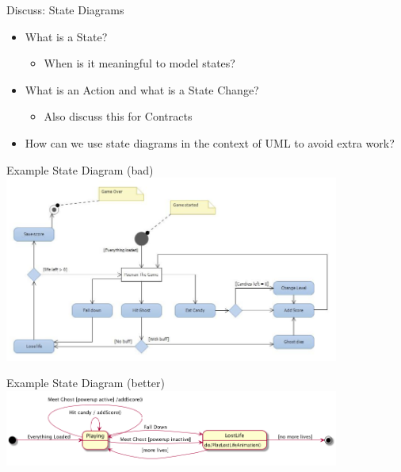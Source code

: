 \documentclass[10pt,t,a4paper]{beamer}
\begin{document}
\begin{frame}[label=sec-1-7]{Discuss: State Diagrams}
\begin{itemize}
\item What is a State?
\begin{itemize}
\item When is it meaningful to model states?
\end{itemize}
\item What is an Action and what is a State Change?
\begin{itemize}
\item Also discuss this for Contracts
\end{itemize}
\item How can we use state diagrams in the context of UML to avoid extra work?
\end{itemize}
\end{frame}
\begin{frame}[label=sec-1-8]{Example State Diagram (bad)}
\includegraphics[width=11cm]{./IExampleBadStateChart.png}
\end{frame}
\begin{frame}[label=sec-1-9]{Example State Diagram (better)}
\includegraphics[width=11cm]{FExampleBadStateChart_fixed.png}
\end{frame}
\end{document}

